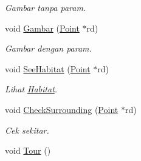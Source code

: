 \begin{DoxyCompactItemize}
\begin{DoxyCompactList}\small\item\em Gambar tanpa param. \end{DoxyCompactList}\item 
void \hyperlink{class_cell_a92cb17a4ec69dadd85b9d701bb4e4368}{Gambar} (\hyperlink{class_point}{Point} $\ast$rd)
\begin{DoxyCompactList}\small\item\em Gambar dengan param. \end{DoxyCompactList}\item 
void \hyperlink{class_cell_aabaa585f3c300a82391b8ec1f9b02174}{See\+Habitat} (\hyperlink{class_point}{Point} $\ast$rd)
\begin{DoxyCompactList}\small\item\em Lihat \hyperlink{class_habitat}{Habitat}. \end{DoxyCompactList}\item 
void \hyperlink{class_cell_a8a7d195e4956a30e418d8b75ca5b7b9a}{Check\+Surrounding} (\hyperlink{class_point}{Point} $\ast$rd)
\begin{DoxyCompactList}\small\item\em Cek sekitar. \end{DoxyCompactList}\item 
void \hyperlink{class_cell_aa8c7d7ae71a6691f8231a3addbd5376c}{Tour} ()\hypertarget{class_cell_aa8c7d7ae71a6691f8231a3addbd5376c}{}\label{class_cell_aa8c7d7ae71a6691f8231a3addbd5376c}


\end{DoxyCompactItemize}
